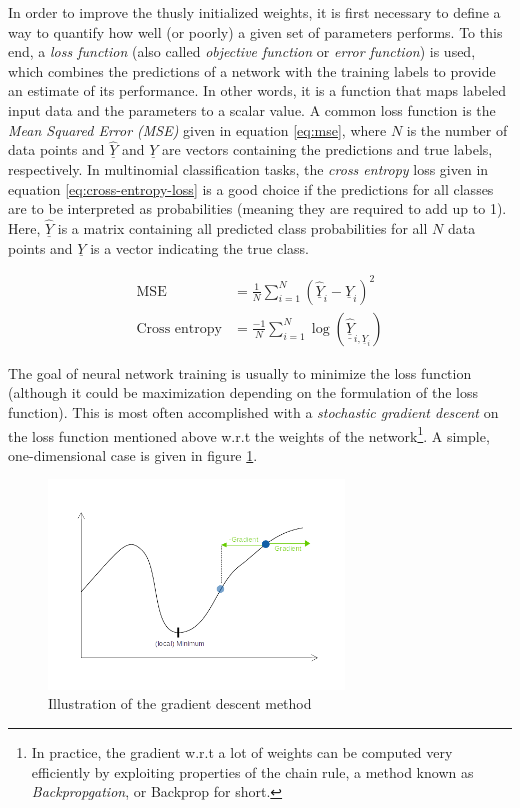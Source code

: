 \documentclass[11pt, a4paper]{article}
\newcommand\braces[1]{\left(#1\right)}
\renewcommand{\vec}[1]{\underline{#1}}
\newcommand{\mat}[1]{\underline{\underline{#1}}}
\begin{document}
In order to improve the thusly initialized weights, it is first necessary to define a way to quantify how well (or poorly) a given set of parameters performs. To this end, a \emph{loss function} (also called \emph{objective function} or \emph{error function}) is used, which combines the predictions of a network with the training labels to provide an estimate of its performance. In other words, it is a function that maps labeled input data and the parameters to a scalar value. A common loss function is the \emph{Mean Squared Error (MSE)} given in equation \eqref{eq:mse}, where $N$ is the number of data points and $\vec{\hat Y}$ and $\vec{Y}$ are vectors containing the predictions and true labels, respectively. In multinomial classification tasks, the \emph{cross entropy} loss given in equation \eqref{eq:cross-entropy-loss} \cite{caffe-cross-entropy} is a good choice if the predictions for all classes are to be interpreted as probabilities (meaning they are required to add up to 1). Here, $\vec{\hat Y}$ is a matrix containing all predicted class probabilities for all $N$ data points and $\vec{Y}$ is a vector indicating the true class.

\begin{align}
	\text{MSE} &= \frac{1}{N} \sum_{i=1}^N \braces{\vec{\hat Y}_i - \vec{Y}_i}^2 \label{eq:mse} \\
	\text{Cross entropy} &= \frac{-1}{N} \sum_{i=1}^N \log{\braces{\mat{\hat Y}_{i, \vec{Y}_i}}} \label{eq:cross-entropy-loss}
\end{align}

The goal of neural network training is usually to minimize the loss function (although it could be maximization depending on the formulation of the loss function). This is most often accomplished with a \emph{stochastic gradient descent} on the loss function mentioned above w.r.t the weights of the network\footnote{In practice, the gradient w.r.t a lot of weights can be computed very efficiently by exploiting properties of the chain rule, a method known as \emph{Backpropgation}, or Backprop for short.}. A simple, one-dimensional case is given in figure \ref{fig:gradient-descent}.

\begin{figure}[htb]
	\centering
	\includegraphics[width=0.7\textwidth]{images/gradient_descent.png}
	\caption{Illustration of the gradient descent method}
	\label{fig:gradient-descent}
\end{figure}
\end{document}
